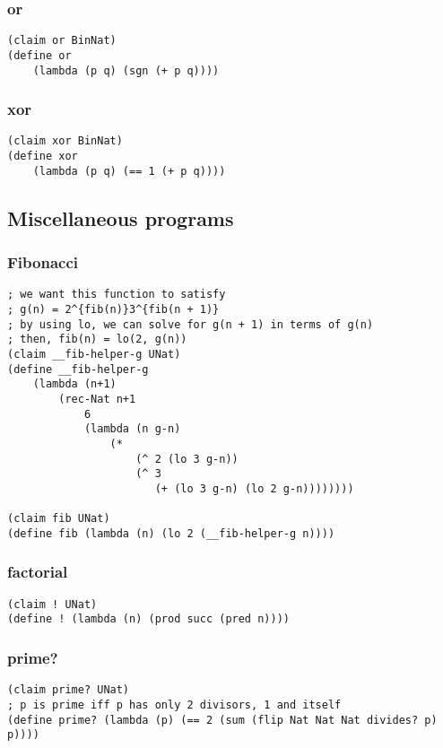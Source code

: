 \subsubsection{or} \label{code:or}
\begin{verbatim}
(claim or BinNat)
(define or
    (lambda (p q) (sgn (+ p q))))
\end{verbatim}

\subsubsection{xor} \label{code:xor}
\begin{verbatim}
(claim xor BinNat)
(define xor
    (lambda (p q) (== 1 (+ p q))))
\end{verbatim}


\subsection{Miscellaneous programs}

\subsubsection{Fibonacci} \label{code:Fibonacci}
\begin{verbatim}
; we want this function to satisfy
; g(n) = 2^{fib(n)}3^{fib(n + 1)}
; by using lo, we can solve for g(n + 1) in terms of g(n)
; then, fib(n) = lo(2, g(n))
(claim __fib-helper-g UNat)
(define __fib-helper-g
    (lambda (n+1)
        (rec-Nat n+1
            6
            (lambda (n g-n) 
                (*
                    (^ 2 (lo 3 g-n))
                    (^ 3
                       (+ (lo 3 g-n) (lo 2 g-n))))))))

(claim fib UNat)
(define fib (lambda (n) (lo 2 (__fib-helper-g n))))
\end{verbatim}

\subsubsection{factorial} \label{code:factorial}
\begin{verbatim}
(claim ! UNat)
(define ! (lambda (n) (prod succ (pred n))))
\end{verbatim}

\subsubsection{prime?} \label{code:prime?}
\begin{verbatim}
(claim prime? UNat)
; p is prime iff p has only 2 divisors, 1 and itself
(define prime? (lambda (p) (== 2 (sum (flip Nat Nat Nat divides? p) p))))
\end{verbatim}

